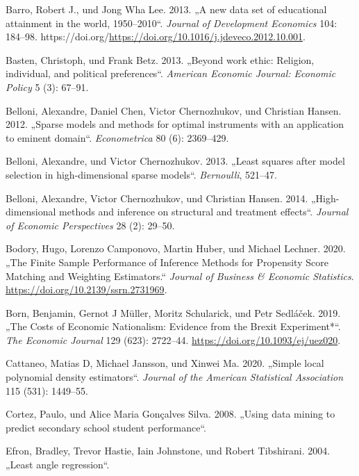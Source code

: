 \documentclass[
  a4paper,
  DIV=11,
  oneside]{scrreprt}
\newlength{\cslhangindent}
\newenvironment{CSLReferences}[2] %
 {\begin{list}{}{%
  \setlength{\itemindent}{0pt}
  \setlength{\leftmargin}{0pt}
  \setlength{\parsep}{0pt}
  \ifodd #1
   \setlength{\leftmargin}{\cslhangindent}
   \setlength{\itemindent}{-1\cslhangindent}
  \fi
  \setlength{\itemsep}{#2\baselineskip}}}
 {\end{list}}
\begin{document}
\begin{CSLReferences}{1}{0}
Barro, Robert J., und Jong Wha Lee. 2013. {„A new data set of
educational attainment in the world, 1950--2010``}. \emph{Journal of
Development Economics} 104: 184--98.
https://doi.org/\url{https://doi.org/10.1016/j.jdeveco.2012.10.001}.

Basten, Christoph, und Frank Betz. 2013. {„Beyond work ethic: Religion,
individual, and political preferences``}. \emph{American Economic
Journal: Economic Policy} 5 (3): 67--91.

Belloni, Alexandre, Daniel Chen, Victor Chernozhukov, und Christian
Hansen. 2012. {„Sparse models and methods for optimal instruments with
an application to eminent domain``}. \emph{Econometrica} 80 (6):
2369--429.

Belloni, Alexandre, und Victor Chernozhukov. 2013. {„Least squares after
model selection in high-dimensional sparse models``}. \emph{Bernoulli},
521--47.

Belloni, Alexandre, Victor Chernozhukov, und Christian Hansen. 2014.
{„High-dimensional methods and inference on structural and treatment
effects``}. \emph{Journal of Economic Perspectives} 28 (2): 29--50.

Bodory, Hugo, Lorenzo Camponovo, Martin Huber, und Michael Lechner.
2020. {„The Finite Sample Performance of Inference Methods for
Propensity Score Matching and Weighting Estimators.``} \emph{Journal of
Business \& Economic Statistics}.
\url{https://doi.org/10.2139/ssrn.2731969}.

Born, Benjamin, Gernot J Müller, Moritz Schularick, und Petr Sedláček.
2019. {„The Costs of Economic Nationalism: Evidence from the Brexit
Experiment*``}. \emph{The Economic Journal} 129 (623): 2722--44.
\url{https://doi.org/10.1093/ej/uez020}.

Cattaneo, Matias D, Michael Jansson, und Xinwei Ma. 2020. {„Simple local
polynomial density estimators``}. \emph{Journal of the American
Statistical Association} 115 (531): 1449--55.

Cortez, Paulo, und Alice Maria Gonçalves Silva. 2008. {„Using data
mining to predict secondary school student performance``}.

Efron, Bradley, Trevor Hastie, Iain Johnstone, und Robert Tibshirani.
2004. {„Least angle regression``}.


\end{CSLReferences}
\end{document}
